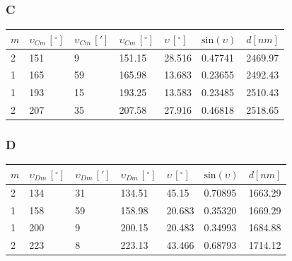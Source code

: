 \documentclass[a4paper, 11pt]{article}
\begin{document}
\subsubsection{C}\label{sub:c} %
\begin{center}
	\begin{tabular}{|l|l|l|l|l|l|l|}
		\hline
		$m $ & $\upsilon_{Cm} \, [^{\circ}]$ & $\upsilon_{Cm} \, [']$ & $\upsilon_{Cm} \, [^{\circ}]$ & $\upsilon \, [^{\circ}]$ & $\text{sin}(\upsilon)$ & $d [nm]$ \\ \hline
		2    & 151                           & 9                      & 151.15                        & 28.516                   & 0.47741                & 2469.97  \\ \hline
		1    & 165                           & 59                     & 165.98                        & 13.683                   & 0.23655                & 2492.43  \\ \hline
		1    & 193                           & 15                     & 193.25                        & 13.583                   & 0.23485                & 2510.43  \\ \hline
		2    & 207                           & 35                     & 207.58                        & 27.916                   & 0.46818                & 2518.65  \\ \hline
	\end{tabular}
\end{center}

\subsubsection{D}\label{sec:d} %
\begin{center}
	\begin{tabular}{|l|l|l|l|l|l|l|}
		\hline
		$m $ & $\upsilon_{Dm} \, [^{\circ}]$ & $\upsilon_{Dm} \, [']$ & $\upsilon_{Dm} \, [^{\circ}]$ & $\upsilon \, [^{\circ}]$ & $\text{sin}(\upsilon)$ & $d [nm]$ \\ \hline
		2    & 134                           & 31                     & 134.51                        & 45.15                    & 0.70895                & 1663.29  \\ \hline
		1    & 158                           & 59                     & 158.98                        & 20.683                   & 0.35320                & 1669.29  \\ \hline
		1    & 200                           & 9                      & 200.15                        & 20.483                   & 0.34993                & 1684.88  \\ \hline
		2    & 223                           & 8                      & 223.13                        & 43.466                   & 0.68793                & 1714.12  \\ \hline
	\end{tabular}
\end{center}
\end{document}
